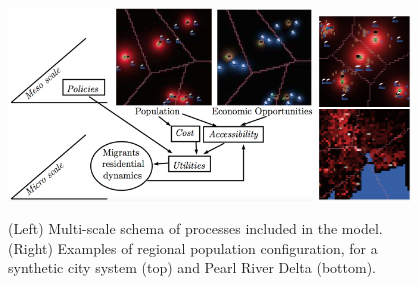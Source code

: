 \begin{figure}[h!]
\centering
\bigskip
\bigskip
\includegraphics[width=0.72\textwidth]{figures/model}
\hspace{0.08cm}\vrule\hspace{0.08cm}
\includegraphics[width=0.22\textwidth]{figures/examples}
\caption{(Left) Multi-scale schema of processes included in the model. (Right) Examples of regional population configuration, for a synthetic city system (top) and Pearl River Delta (bottom).}
\label{fig:model}
\end{figure}



